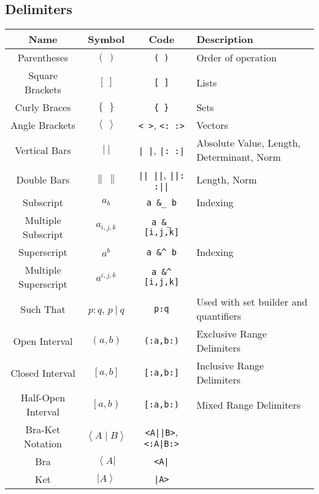 \documentclass{article}
\begin{document}
  \subsection{Delimiters} %
  \label{sub:delimiters}
  \begin{table}[!h]
    \centering
    \begin{tabular}{|c|c|c|l|}
      \hline
      \textbf{Name} & \textbf{Symbol} & \textbf{Code} & \textbf{Description} \\
      \hline\hline
      Parentheses & \( \left( \ \right) \) & \texttt{( )} & Order of operation \\
      Square Brackets & \( \left[ \ \right] \) & \texttt{[ ]} & Lists \\
      Curly Braces & \( \left\{ \ \right\} \) & \texttt{\{ \}} & Sets \\
      Angle Brackets & \( \left\langle \ \right\rangle \) & \texttt{< >}, \texttt{<: :>} & Vectors \\
      Vertical Bars & \( \left| \ \right| \) & \texttt{| |}, \texttt{|: :|} & Absolute Value, Length, Determinant, Norm \\
      Double Bars & \( \left\| \ \right\| \) & \texttt{|| ||}, \texttt{||: :||} & Length, Norm \\
      \hline
      Subscript & \( a_b \) & \texttt{a \&\_ b} & Indexing \\
      Multiple Subscript & \( a_{i,j,k} \) & \texttt{a \&\_ [i,j,k]} & \\
      Superscript & \( a^b \) & \texttt{a \&\^{} b} & Indexing \\
      Multiple Superscript & \( a^{i,j,k} \) & \texttt{a \&\^{} [i,j,k]} & \\
      Such That & \( p : q \), \( p ~|~ q \) & \texttt{p:q} & Used with set builder and quantifiers \\
      \hline
      Open Interval & \( \left( a,b \right) \) & \texttt{(:a,b:)} & Exclusive Range Delimiters \\
      Closed Interval & \( \left[ a,b \right] \) & \texttt{[:a,b:]} & Inclusive Range Delimiters \\
      Half-Open Interval & \( \left[ a,b \right) \) & \texttt{[:a,b:)} & Mixed Range Delimiters \\
      \hline
      Bra-Ket Notation & \( \left\langle A \mid B \right\rangle \) & \texttt{<A||B>}, \texttt{<:A|B:>} & \\
      Bra & \( \left\langle A \right| \) & \texttt{<A|} & \\
      Ket & \( \left| A \right\rangle \) & \texttt{|A>} & \\
      \hline
    \end{tabular}
  \end{table}
\end{document}
